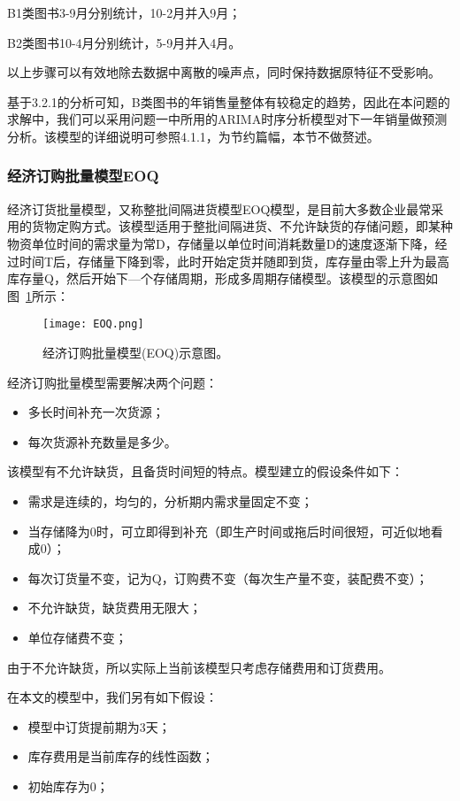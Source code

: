 \documentclass[bwprint]{gmcmthesis}
\begin{document}
B1类图书3-9月分别统计，10-2月并入9月；

B2类图书10-4月分别统计，5-9月并入4月。

以上步骤可以有效地除去数据中离散的噪声点，同时保持数据原特征不受影响。

基于3.2.1的分析可知，B类图书的年销售量整体有较稳定的趋势，因此在本问题的求解中，我们可以采用问题一中所用的ARIMA时序分析模型对下一年销量做预测分析。该模型的详细说明可参照4.1.1，为节约篇幅，本节不做赘述。

\subsubsection{经济订购批量模型EOQ}

经济订货批量模型，又称整批间隔进货模型EOQ模型，是目前大多数企业最常采用的货物定购方式。该模型适用于整批间隔进货、不允许缺货的存储问题，即某种物资单位时间的需求量为常D，存储量以单位时间消耗数量D的速度逐渐下降，经过时间T后，存储量下降到零，此时开始定货并随即到货，库存量由零上升为最高库存量Q，然后开始下—个存储周期，形成多周期存储模型。该模型的示意图如图~\ref{fig:eoq}所示：

\begin{figure}[H]
	\centering		
	\texttt{[image: EOQ.png]}
	\caption{经济订购批量模型(EOQ)示意图。}
	\label{fig:eoq}
\end{figure}

经济订购批量模型需要解决两个问题：
\begin{itemize}
 \item 多长时间补充一次货源；
 \item 每次货源补充数量是多少。
\end{itemize}
该模型有不允许缺货，且备货时间短的特点。模型建立的假设条件如下：

\begin{itemize}
 \item 需求是连续的，均匀的，分析期内需求量固定不变；
 \item 当存储降为0时，可立即得到补充（即生产时间或拖后时间很短，可近似地看成0）；
 \item 每次订货量不变，记为Q，订购费不变（每次生产量不变，装配费不变）；
 \item 不允许缺货，缺货费用无限大；
 \item 单位存储费不变；
\end{itemize}
由于不允许缺货，所以实际上当前该模型只考虑存储费用和订货费用。

在本文的模型中，我们另有如下假设：
\begin{itemize}
 \item 模型中订货提前期为3天；
 \item 库存费用是当前库存的线性函数；
 \item 初始库存为0；
\end{itemize}
\end{document}
